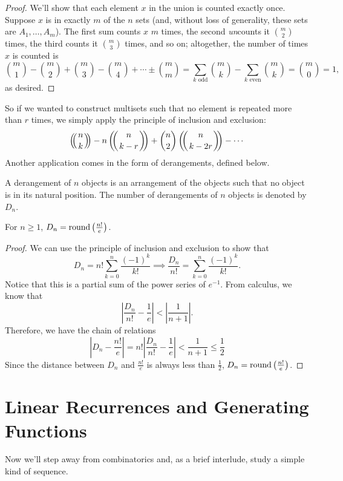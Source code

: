 \documentclass[../m055main.tex]{subfiles}
\begin{document}
\begin{proof}
    We'll show that each element $x$ in the union is counted exactly once.
    Suppose $x$ is in exactly $m$ of the $n$ sets (and, without loss of generality, these sets are $A_1, \ldots, A_m$).
    The first sum counts $x$ $m$ times, the second \textit{un}counts it $\binom{m}{2}$ times, the third counts it $\binom{m}{3}$ times, and so on; altogether, the number of times $x$ is counted is
    \[ \binom{m}{1} - \binom{m}{2} + \binom{m}{3} - \binom{m}{4} + \cdots \pm \binom{m}{m} = \sum_{k\text{ odd}} \binom{m}{k} - \sum_{k\text{ even}} \binom{m}{k} = \binom{m}{0} = 1, \]
    as desired.
\end{proof}

So if we wanted to construct multisets such that no element is repeated more than $r$ times, we simply apply the principle of inclusion and exclusion:
\[ \mchoose{n}{k} - n \mchoose{n}{k-r} + \binom{n}{2} \mchoose{n}{k-2r} - \cdots \]
Another application comes in the form of derangements, defined below.

\begin{definition}[Derangement]
    A derangement of $n$ objects is an arrangement of the objects such that no object is in its natural position.
    The number of derangements of $n$ objects is denoted by $D_n$.
\end{definition}

\begin{theorem}[]
    For $n \geq 1$, $D_n = \operatorname{round} \left( \frac{n!}{e} \right)$.
\end{theorem}

\begin{proof}
    We can use the principle of inclusion and exclusion to show that
    \[ D_n = n! \sum_{k=0}^{n} \frac{(-1)^k}{k!} \implies \frac{D_n}{n!} = \sum_{k=0}^{n} \frac{(-1)^k}{k!}. \]
    Notice that this is a partial sum of the power series of $e^{-1}$.
    From calculus, we know that
    \[ \left| \frac{D_n}{n!} - \frac{1}{e} \right| < \left| \frac{1}{n+1} \right|. \]
    Therefore, we have the chain of relations
    \[ \left| D_n - \frac{n!}{e} \right| = n! \left| \frac{D_n}{n!} - \frac{1}{e} \right| < \frac{1}{n+1} \leq \frac{1}{2} \]
    Since the distance between $D_n$ and $\frac{n!}{e}$ is always less than $\frac{1}{2}$, $D_n = \operatorname{round}\left( \frac{n!}{e} \right)$.
\end{proof}

\section{Linear Recurrences and Generating Functions}
Now we'll step away from combinatorics and, as a brief interlude, study a simple kind of sequence.
\end{document}
